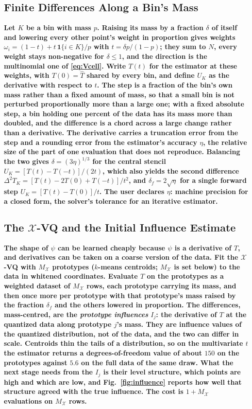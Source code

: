 \documentclass[runningheads]{llncs}
\newif\ifrev \revtrue
\newcommand{\rev}[1]{\ifrev{\color{blue}\bfseries #1}\else#1\fi}
\newcommand{\XVQ}{\ensuremath{\mathcal{X}}-VQ}
\newcommand{\MX}{M_{\mathcal{X}}}
\begin{document}
\subsection{Finite Differences Along a Bin's Mass}\label{sec:difference}

\rev{Let $K$ be a bin with mass $p$. Raising its mass by a fraction $\delta$ of itself and lowering every other point's weight in proportion gives weights $\omega_i = (1-t) + t\,\mathbf{1}\{i \in K\}/p$ with $t = \delta p/(1-p)$; they sum to $N$, every weight stays non-negative for $\delta \le 1$, and the direction is the multinomial one of \eqref{eq:Vcell}. Write $T(t)$ for the estimator at these weights, with $T(0) = \hat T$ shared by every bin, and define $U_K$ as the derivative with respect to $t$. The step is a fraction of the bin's own mass rather than a fixed amount of mass, so that a small bin is not perturbed proportionally more than a large one; with a fixed absolute step, a bin holding one percent of the data has its mass more than doubled, and the difference is a chord across a large change rather than a derivative. The derivative carries a truncation error from the step and a rounding error from the estimator's accuracy $\eta$, the relative size of the part of one evaluation that does not reproduce. Balancing the two gives $\delta = (3\eta)^{1/3}$ for the central stencil $U_K = [T(t) - T(-t)]/(2t)$, which also yields the second difference $\Delta^2 T_K = [T(t) - 2T(0) + T(-t)]/t^2$, and $\delta_f = 2\sqrt{\eta}$ for a single forward step $U_K = [T(t) - T(0)]/t$. The user declares $\eta$: machine precision for a closed form, the solver's tolerance for an iterative estimator.}

\subsection{The $\mathcal{X}$-VQ and the Initial Influence Estimate}\label{sec:xvq}

\rev{The shape of $\psi$ can be learned cheaply because $\psi$ is a derivative of $T$, and derivatives can be taken on a coarse version of the data. Fit the \XVQ{} with $\MX$ prototypes ($k$-means centroids; $\MX$ is set below) to the data in whitened coordinates. Evaluate $T$ on the prototypes as a weighted dataset of $\MX$ rows, each prototype carrying its mass, and then once more per prototype with that prototype's mass raised by the fraction $\delta_f$ and the others lowered in proportion. The differences, mass-centred, are the \emph{prototype influences} $I_j$: the derivative of $T$ at the quantized data along prototype $j$'s mass. They are influence values of the quantized distribution, not of the data, and the two can differ in scale. Centroids thin the tails of a distribution, so on the multivariate $t$ the estimator returns a degrees-of-freedom value of about $150$ on the prototypes against $5.6$ on the full data of the same draw. What the next stage needs from the $I_j$ is their level structure, which points are high and which are low, and Fig.~\ref{fig:influence} reports how well that structure agreed with the true influence. The cost is $1 + \MX$ evaluations on $\MX$ rows.}
\end{document}
